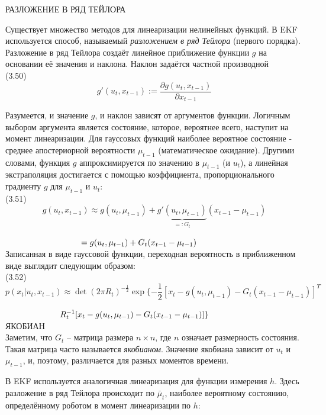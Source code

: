 \documentclass[10pt,a4paper]{article}
\begin{document}
РАЗЛОЖЕНИЕ В РЯД ТЕЙЛОРА

Существует множество методов для линеаризации нелинейных функций. В EKF используется способ, называемый \textit{разложением в ряд Тейлора} (первого порядка). Разложение в ряд Тейлора создаёт линейное приближение функции $g$ на основании её значения и наклона. Наклон задаётся частной производной\\

(3.50)
$$g'(u_t,x_{t-1}):=\frac{\partial g(u_t,x_{t-1})}{\partial x_{t-1}}$$

Разумеется, и значение $g$, и наклон зависят от аргументов функции. Логичным выбором аргумента является состояние, которое, вероятнее всего, наступит на момент линеаризации. Для гауссовых функций наиболее вероятное состояние - среднее апостериорной вероятности $\mu_{t-1}$ (математическое ожидание). Другими словами, функция $g$ аппроксимируется по значению в $\mu_{t-1}$ (и $u_t$), а линейная экстраполяция достигается с помощью коэффициента, пропорционального градиенту $g$ для $\mu_{t-1}$ и $u_t$:\\

(3.51)
$$g(u_t,x_{t-1})\approx g(u_t,\mu_{t-1})+\underbrace{g'(u_t,\mu_{t-1})}_{=:G_t}(x_{t-1}-\mu_{t-1})$$

$\hspace{32mm}=g(u_t,\mu_{t-1})+G_t(x_{t-1}-\mu_{t-1})$\\

Записанная в виде гауссовой функции, переходная вероятность в приближенном виде выглядит следующим образом:\\

(3.52)
$$p(x_t|u_t,x_{t-1})\approx\det(2\pi R_t)^{-\frac{1}{2}}\exp\{-\frac{1}{2}[x_t-g(u_t,\mu_{t-1})-G_t(x_{t-1}-\mu_{t-1})]^T$$

$\hspace{23mm}R_t^{-1}[x_t-g(u_t,\mu_{t-1})-G_t(x_{t-1}-\mu_{t-1})]\}$\\

ЯКОБИАН\\
Заметим, что $G_t$ – матрица размера $n\times n$, где $n$ означает размерность состояния. Такая матрица часто называется \textit{якобианом}. Значение якобиана зависит от $u_t$ и $\mu_{t-1}$, и, поэтому, различается для разных моментов времени.

В EKF используется аналогичная линеаризация для функции измерения $h$. Здесь разложение в ряд Тейлора происходит по $\bar{\mu}_t$, наиболее вероятному состоянию, определённому роботом в момент линеаризации по $h$:\\
\end{document}
